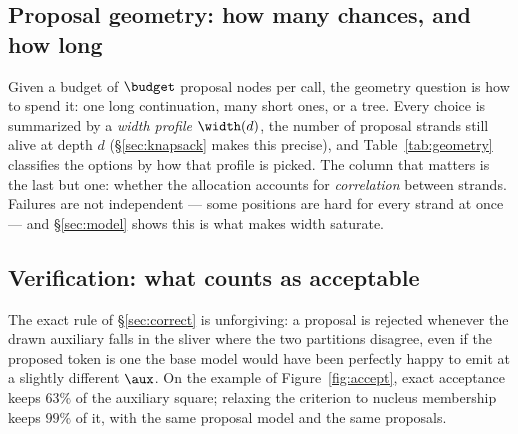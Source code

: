 \documentclass{article} %
\makeatletter
\newenvironment{ai}
  {\color{lightgray}%
   \@ifpackageloaded{caption}{\captionsetup{font={color=lightgray}}}{}%
   \let\ai@savedfloatreset\@floatboxreset
   \g@addto@macro\@floatboxreset{\color{lightgray}}}
  {\global\let\@floatboxreset\ai@savedfloatreset}
\makeatother
\begin{document}
\begin{ai}

\subsection{Proposal geometry: how many chances, and how long}
\label{sec:geometry}

Given a budget of $\budget$ proposal nodes per call, the geometry question is how
to spend it: one long continuation, many short ones, or a tree. Every choice is
summarized by a \emph{width profile} $\width(d)$, the number of proposal strands
still alive at depth $d$ (\S\ref{sec:knapsack} makes this precise), and
Table~\ref{tab:geometry} classifies the options by how that profile is picked.
The column that matters is the last but one: whether the allocation accounts for
\emph{correlation} between strands. Failures are not independent --- some
positions are hard for every strand at once --- and \S\ref{sec:model} shows this
is what makes width saturate.

\begin{table}[t]
  \centering
  \caption{Proposal geometries. ``correlated'' is whether the allocation rule
  models dependence between sibling strands rather than treating per-node
  acceptance as independent. $\Sfun[w,d]$ is the survival function of
  \S\ref{sec:model}.}
  \label{tab:geometry}
  
\end{table}

\subsection{Verification: what counts as acceptable}
\label{sec:verification}

The exact rule of \S\ref{sec:correct} is unforgiving: a proposal is rejected
whenever the drawn auxiliary falls in the sliver where the two partitions
disagree, even if the proposed token is one the base model would have been
perfectly happy to emit at a slightly different $\aux$. On the example of
Figure~\ref{fig:accept}, exact acceptance keeps $63\%$ of the auxiliary square;
relaxing the criterion to nucleus membership keeps $99\%$ of it, with the same
proposal model and the same proposals.


\end{ai}
\end{document}
